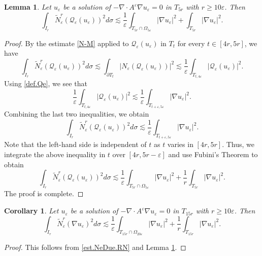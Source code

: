 \documentclass[reqno,12pt]{amsart} %
\newtheorem{lemma}[theorem]{Lemma}
\newtheorem{corollary}[theorem]{Corollary}
\theoremstyle{definition}
\theoremstyle{remark}
\numberwithin{equation}{section}
\newcommand{\Q}{\mathcal{Q}}
\newcommand{\e}{\varepsilon}
\begin{document}
\begin{lemma}\label{lem.NeQe}
    Let $u_\e$ be a solution of $-\nabla\cdot A^\e \nabla u_\e = 0$ in $T_{5r}$ with $r \ge 10 \e$. Then
    \begin{equation}
    \int_{I_{r}} \widetilde{N}_\e^{r} (\Q_\e(u_\e))^2 d\sigma \lesssim \frac{1}{\e} \int_{T_{5r} \cap \Omega_{5\e}} |\nabla u_\e|^2 + \int_{T_{5r}} |\nabla u_\e|^2.
\end{equation}
\end{lemma}
\begin{proof}
By the estimate \eqref{N-M} applied to $\Q_\e(u_\e)$ in $T_{t}$ for every $t \in [4r, 5r]$, we have
\begin{equation}
    \int_{I_{r}} \widetilde{N}_\e^{r} (\Q_\e(u_\e))^2 d\sigma \lesssim \int_{\partial T_{t}} |N_\e(\Q_\e(u_\e))|^2 \lesssim \frac{1}{\e} \int_{T_{t,4\e}} |\Q_\e(u_\e)|^2.
\end{equation}
Using \eqref{def.Qe}, we see that 
\begin{equation}
    \frac{1}{\e} \int_{T_{t,4\e}} |\Q_\e(u_\e)|^2 \lesssim \frac{1}{\e} \int_{T_{t+\e, 5\e}} |\nabla u_\e|^2. %
\end{equation}
Combining the last two inequalities, we obtain
\begin{equation}
    \int_{I_{r}} \widetilde{N}_\e^{r} (\Q_\e(u_\e))^2 d\sigma \lesssim \frac{1}{\e} \int_{T_{t+\e, 5\e}} |\nabla u_\e|^2.
\end{equation}
Note that the left-hand side is independent of $t$ as $t$ varies in $[4r,5r]$. Thus, we integrate the above inequality in $t$ over $[4r,5r - \e]$ and use Fubini's Theorem to obtain
\begin{equation}
    \int_{I_{r}} \widetilde{N}_\e^{r} (\Q_\e(u_\e))^2 d\sigma \lesssim \frac{1}{\e} \int_{T_{5r} \cap \Omega_{5\e}} |\nabla u_\e|^2 + \frac{1}{r} \int_{T_{5r}} |\nabla u_\e|^2.
\end{equation}
The proof is complete.
\end{proof}

\begin{corollary}\label{coro.localR2}
    Let $u_\e$ be a solution of $-\nabla\cdot A^\e \nabla u_\e =0 $ in $T_{15r}$ with $r \ge 10\e$. Then
    \begin{equation}\label{est.NeDue.localL2}
    \int_{I_{r}} \widetilde{N}_\e^{r}(\nabla u_\e)^2 d\sigma  \lesssim \frac{1}{\e} \int_{T_{15r} \cap \Omega_{20\e}} |\nabla u_\e|^2 + \frac{1}{r}\int_{T_{15r}} |\nabla u_\e|^2.
    \end{equation}
\end{corollary}
\begin{proof}
    This follows from \eqref{est.NeDue.RN} and Lemma \ref{lem.NeQe}.
\end{proof}
\end{document}
